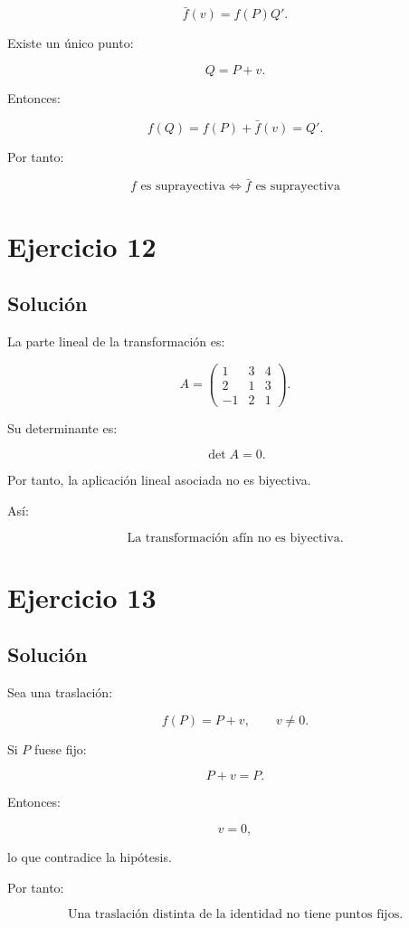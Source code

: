 \documentclass[11pt,a4paper]{article}
\begin{document}
\[
\bar f(v)=f(P)Q'.
\]

Existe un único punto:

\[
Q=P+v.
\]

Entonces:

\[
f(Q)
=
f(P)+\bar f(v)
=
Q'.
\]

Por tanto:

\[
\boxed{
f\text{ es suprayectiva}\iff\bar f\text{ es suprayectiva}
}
\]

\section{Ejercicio 12}
\subsection{Solución}

La parte lineal de la transformación es:

\[
A=
\begin{pmatrix}
1&3&4\\
2&1&3\\
-1&2&1
\end{pmatrix}.
\]

Su determinante es:

\[
\det A=0.
\]

Por tanto, la aplicación lineal asociada no es biyectiva.

Así:

\[
\boxed{
\text{La transformación afín no es biyectiva.}
}
\]

\section{Ejercicio 13}
\subsection{Solución}

Sea una traslación:

\[
f(P)=P+v,
\qquad
v\neq0.
\]

Si \(P\) fuese fijo:

\[
P+v=P.
\]

Entonces:

\[
v=0,
\]

lo que contradice la hipótesis.

Por tanto:

\[
\boxed{
\text{Una traslación distinta de la identidad no tiene puntos fijos.}
}
\]
\end{document}
